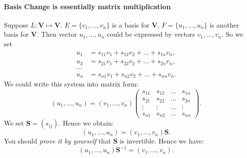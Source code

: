 \paragraph{Basis Change is essentially matrix multiplication}
Suppose $L:\bm V\mapsto \bm V$. $E=\{v_1,\dots,v_n\}$ is a basis for $\bm V$, $F=\{u_1,\dots,u_n\}$ is another basis for $\bm V$. Then vector $u_1,\dots,u_n$ could be expressed by vectors $v_1,\dots,v_n$. So we set
\[
\begin{aligned}
u_1&=s_{11}v_1+s_{12}v_2+\dots+s_{1n}v_n,\\
u_2&=s_{21}v_1+s_{22}v_2+\dots+s_{2n}v_n,\\
\dots\\
u_n&=s_{n1}v_1+s_{n2}v_2+\dots+s_{nn}v_n.
\end{aligned}
\]
We could write this system into matrix form:
\[
(u_1,\dots,u_n)=(v_1,\dots,v_n)\begin{pmatrix}
s_{11}&s_{12}&\dots&s_{1n}\\
s_{21}&s_{22}&\dots&s_{2n}\\
\vdots&\vdots&\dots&\vdots\\
s_{n1}&s_{n2}&\dots&s_{nn}
\end{pmatrix}.
\]
We set $\bm S=(s_{ij})$. Hence we obtain:
\begin{equation}\label{basis_change_formula}
(u_1,\dots,u_n)=(v_1,\dots,v_n)\bm S.
\end{equation}
You should \emph{prove it by yourself} that $\bm S$ is invertible. Hence we have:
\begin{equation}\label{basis_change_formula_inverse}
(u_1,\dots,u_n)\bm S^{-1}=(v_1,\dots,v_n).
\end{equation}
